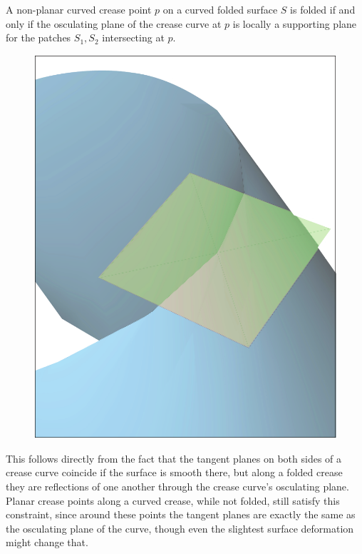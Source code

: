 \begin{theorem}\label{Thm:supporting_plane}
A non-planar curved crease point $p$ on a curved folded surface $S$ is folded if and only if the osculating plane of the crease curve at $p$ is locally a supporting plane for the patches $S_1,S_2$ intersecting at $p$.
\end{theorem}
\setlength{\columnsep}{8pt}%
\begin{figure}
  \centering
  \includegraphics[width=\linewidth]{figures/plane_side.pdf}
\end{figure}
This follows directly from the fact that the tangent planes on both sides of a crease curve coincide if the surface is smooth there, but along a folded crease they are reflections of one another through the crease curve's osculating plane. Planar crease points along a curved crease, while not folded, still satisfy this constraint, since around these points the tangent planes are exactly the same as the osculating plane of the curve, though even the slightest surface deformation might change that. 

